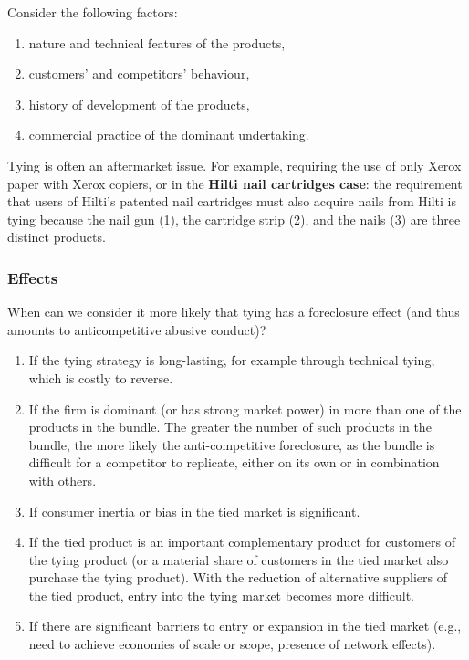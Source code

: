             Consider the following factors:
            \begin{enumerate}
                \item nature and technical features of the products,
                \item customers’ and competitors’ behaviour,
                \item history of development of the products,
                \item commercial practice of the dominant undertaking.
            \end{enumerate}
            
            Tying is often an aftermarket issue. For example, requiring the use of only Xerox paper with Xerox copiers, or in the \textbf{Hilti nail cartridges case}: the requirement that users of Hilti’s patented nail cartridges must also acquire nails from Hilti is tying because the nail gun (1), the cartridge strip (2), and the nails (3) are three distinct products.


        \subsubsection{Effects}

            When can we consider it more likely that tying has a foreclosure effect (and thus amounts to anticompetitive abusive conduct)?
            
            \begin{enumerate}
                \item If the tying strategy is long-lasting, for example through technical tying, which is costly to reverse.
                \item If the firm is dominant (or has strong market power) in more than one of the products in the bundle. The greater the number of such products in the bundle, the more likely the anti-competitive foreclosure, as the bundle is difficult for a competitor to replicate, either on its own or in combination with others.
                \item If consumer inertia or bias in the tied market is significant.
                \item If the tied product is an important complementary product for customers of the tying product (or a material share of customers in the tied market also purchase the tying product). With the reduction of alternative suppliers of the tied product, entry into the tying market becomes more difficult.
                \item If there are significant barriers to entry or expansion in the tied market (e.g., need to achieve economies of scale or scope, presence of network effects).
            \end{enumerate}

